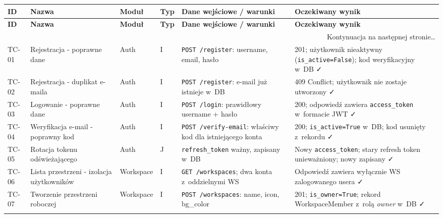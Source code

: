 \documentclass[12pt,a4paper]{article}
\begin{document}
\begingroup
\scriptsize
\setlength{\tabcolsep}{2pt}
\begin{longtable}{p{1cm} p{3cm} p{1.4cm} p{0.7cm} p{4.5cm} p{4.5cm}}
\toprule
\textbf{ID} & \textbf{Nazwa} & \textbf{Moduł} & \textbf{Typ} & \textbf{Dane wejściowe / warunki} & \textbf{Oczekiwany wynik} \\
\midrule
\endfirsthead
\toprule
\textbf{ID} & \textbf{Nazwa} & \textbf{Moduł} & \textbf{Typ} & \textbf{Dane wejściowe / warunki} & \textbf{Oczekiwany wynik} \\
\midrule
\endhead
\midrule
\multicolumn{6}{r}{\footnotesize Kontynuacja na następnej stronie\ldots} \\
\endfoot
\bottomrule
\endlastfoot

TC-01 & Rejestracja - poprawne dane & Auth & I &
  \texttt{POST /register}: username, email, hasło &
  201; użytkownik nieaktywny (\texttt{is\_active=False}); kod weryfikacyjny w~DB \faCheck \\
\addlinespace

TC-02 & Rejestracja - duplikat e-maila & Auth & I &
  \texttt{POST /register}: e-mail już istnieje w~DB &
  409 Conflict; użytkownik nie zostaje utworzony \faCheck \\
\addlinespace

TC-03 & Logowanie - poprawne dane & Auth & I &
  \texttt{POST /login}: prawidłowy username + hasło &
  200; odpowiedź zawiera \texttt{access\_token} w~formacie JWT \faCheck \\
\addlinespace

TC-04 & Weryfikacja e-mail - poprawny kod & Auth & I &
  \texttt{POST /verify-email}: właściwy kod dla istniejącego konta &
  200; \texttt{is\_active=True} w~DB; kod usunięty z~rekordu \faCheck \\
\addlinespace

TC-05 & Rotacja tokenu odświeżającego & Auth & J &
  \texttt{refresh\_token} ważny, zapisany w~DB &
  Nowy \texttt{access\_token}; stary refresh token unieważniony; nowy zapisany \faCheck \\
\addlinespace

\midrule

TC-06 & Lista przestrzeni - izolacja użytkowników & Workspace & I &
  \texttt{GET /workspaces}; dwa konta z~oddzielnymi WS &
  Odpowiedź zawiera wyłącznie WS zalogowanego usera \faCheck \\
\addlinespace

TC-07 & Tworzenie przestrzeni roboczej & Workspace & I &
  \texttt{POST /workspaces}: name, icon, bg\_color &
  201; \texttt{is\_owner=True}; rekord WorkspaceMember z~rolą \emph{owner} w~DB \faCheck \\
\addlinespace


\end{longtable}
\end{document}
